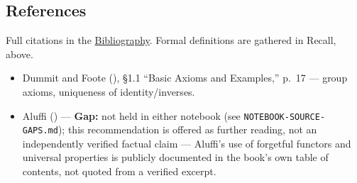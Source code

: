 \subsection{References}\label{sec:06-groups:01-definition:3}

Full citations in the \hyperref[sec:root:bibliography:1]{Bibliography}. Formal definitions are gathered in Recall, above.

\begin{itemize}
\tightlist
\item
  Dummit and Foote (\cite{DummitFoote2003}), §1.1 ``Basic Axioms and Examples,'' p.~17 --- group axioms, uniqueness of identity/inverses.
\item
  Aluffi (\cite{Aluffi2009}) --- \textbf{Gap:} not held in either notebook (see \texttt{NOTEBOOK-\allowbreak{}SOURCE-\allowbreak{}GAPS.md}); this recommendation is offered as further reading, not an independently verified factual claim --- Aluffi's use of forgetful functors and universal properties is publicly documented in the book's own table of contents, not quoted from a verified excerpt.
\end{itemize}
